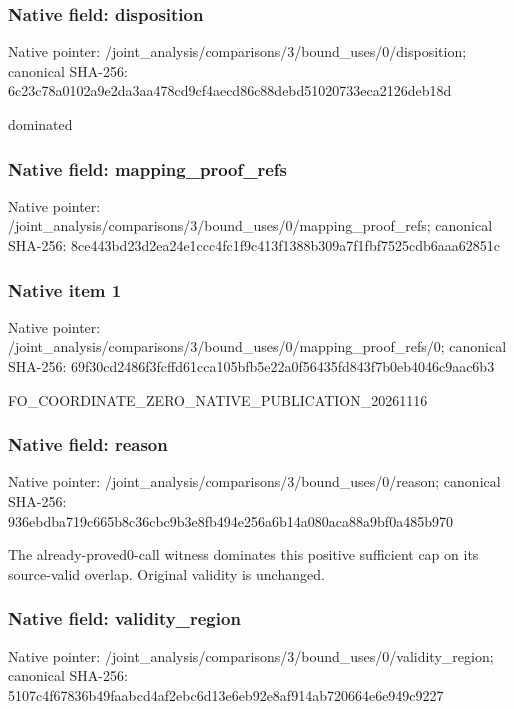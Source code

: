 \documentclass[10pt,a4paper]{article}
\begin{document}
\subsubsection{Native field: disposition}
Native pointer: /joint\_\allowbreak{}analysis/comparisons/3/bound\_\allowbreak{}uses/0/disposition; canonical SHA-256: 6c23c78a0102a9e2da3aa478cd9cf4aecd86c88debd51020733eca2126deb18d

\begingroup\raggedright\sloppy dominated\par\endgroup

\subsubsection{Native field: mapping\_\allowbreak{}proof\_\allowbreak{}refs}
Native pointer: /joint\_\allowbreak{}analysis/comparisons/3/bound\_\allowbreak{}uses/0/mapping\_\allowbreak{}proof\_\allowbreak{}refs; canonical SHA-256: 8ce443bd23d2ea24e1ccc4fc1f9c413f1388b309a7f1fbf7525cdb6aaa62851c

\subsubsection{Native item 1}
Native pointer: /joint\_\allowbreak{}analysis/comparisons/3/bound\_\allowbreak{}uses/0/mapping\_\allowbreak{}proof\_\allowbreak{}refs/0; canonical SHA-256: 69f30cd2486f3fcffd61cca105bfb5e22a0f56435fd843f7b0eb4046c9aac6b3

\begingroup\raggedright\sloppy FO\_\allowbreak{}COORDINATE\_\allowbreak{}ZERO\_\allowbreak{}NATIVE\_\allowbreak{}PUBLICATION\_\allowbreak{}20261116\par\endgroup

\subsubsection{Native field: reason}
Native pointer: /joint\_\allowbreak{}analysis/comparisons/3/bound\_\allowbreak{}uses/0/reason; canonical SHA-256: 936ebdba719c665b8c36cbc9b3e8fb494e256a6b14a080aca88a9bf0a485b970

\begingroup\raggedright\sloppy The already-proved0-call witness dominates this positive sufficient cap on its source-valid overlap. Original validity is unchanged.\par\endgroup

\subsubsection{Native field: validity\_\allowbreak{}region}
Native pointer: /joint\_\allowbreak{}analysis/comparisons/3/bound\_\allowbreak{}uses/0/validity\_\allowbreak{}region; canonical SHA-256: 5107c4f67836b49faabcd4af2ebc6d13e6eb92e8af914ab720664e6e949c9227
\end{document}
